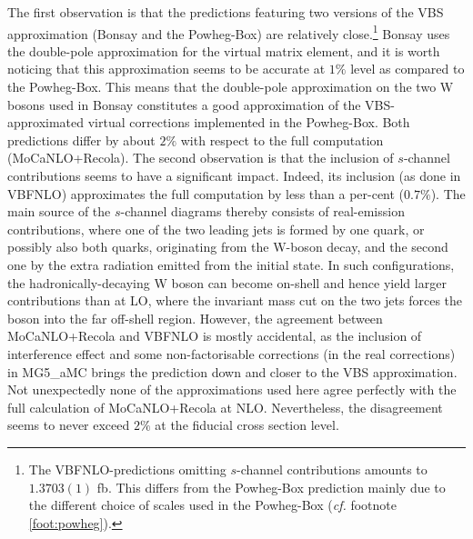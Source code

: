 The first observation is that the predictions featuring two versions
of the VBS approximation ({\sc Bonsay} and the {\sc Powheg-Box}) are
relatively close.\footnote{The {\sc VBFNLO}-predictions omitting
$s$-channel contributions amounts to $1.3703(1)$ fb. This differs from
the {\sc Powheg-Box} prediction mainly due to the different choice of
scales used in the {\sc Powheg-Box} (\emph{cf.}
footnote \ref{foot:powheg}).} {\sc Bonsay} uses the double-pole
approximation for the virtual matrix element, and it is worth noticing
that this approximation seems to be accurate at $1\%$ level as
compared to the {\sc Powheg-Box}. This means that the double-pole
approximation on the two W bosons used in {\sc Bonsay} constitutes a
good approximation of the VBS-approxi\-mated virtual corrections
implemented in the {\sc Powheg-Box}.  Both predictions differ by about
$2\%$ with respect to the full computation ({\sc MoCaNLO+Recola}).
The second observation is that the inclusion of $s$-channel
contributions seems to have a significant impact.  Indeed, its
inclusion (as done in {\sc VBFNLO}) approximates the full computation
by less than a per-cent ($0.7\%$). The main source of
the $s$-channel diagrams thereby consists of real-emission
contributions, where one of the two leading jets is formed by one
quark, or possibly also both quarks, originating from the W-boson decay,
and the second one by the extra radiation emitted from the initial
state. In such configurations, the hadronically-decaying W boson can
become on-shell and hence yield larger contributions than at LO, where
the invariant mass cut on the two jets forces the boson into the far
off-shell region.
However, the agreement between {\sc MoCaNLO+Recola} and {\sc VBFNLO} is mostly accidental, as the inclusion of interference effect and some non-factorisable corrections (in the real corrections) in {\sc MG5\_aMC} brings the prediction down and closer to the VBS approximation.
Not unexpectedly none of the approximations used here agree perfectly with the full calculation of {\sc MoCaNLO\-+Recola} at NLO.
Nevertheless, the disagreement seems to never exceed $2\%$ at the fiducial cross section level.

